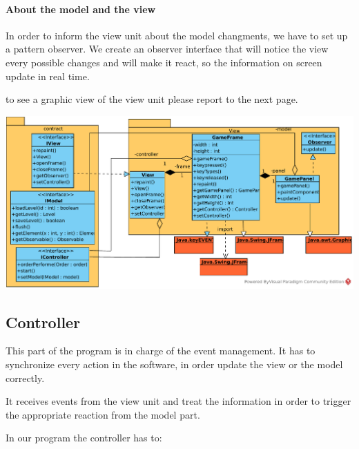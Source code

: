 \documentclass{report}
\begin{document}
\paragraph{About the model and the view}

In order to inform the view unit about the model changments, we have to set up a pattern observer.
We create an observer interface that will notice the view every possible changes and will make it react, so the information on screen update in real time.

\bigskip

to see a graphic view of the view unit please report to the next page.

\begin{landscape}

\vspace*{\fill}

\includegraphics[scale=1.1]{resources/SVG/view.pdf}

\vspace*{\fill}

\end{landscape}

\subsection{Controller}

This part of the program is in charge of the event management. It has to synchronize every action in the software, in order update the view or the model correctly. 

It receives events from the view unit and treat the information in order to trigger the appropriate reaction from the model part.

In our program the controller has to:
\end{document}
